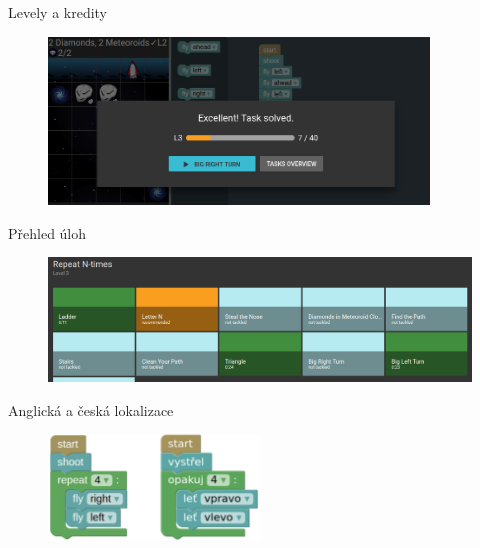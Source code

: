 \documentclass[
]{beamer}
\begin{document}
\begin{frame}{Levely a kredity}
\begin{figure}
\includegraphics[width=0.9\textwidth,height=.65\textheight,keepaspectratio]{../img/robomission-levels-credits}
\end{figure}
\end{frame}

\begin{frame}{Přehled úloh}
\begin{figure}
\includegraphics[width=\textwidth,height=.75\textheight,keepaspectratio]{../img/robomission-tasks-overview}
\end{figure}
\end{frame}

\begin{frame}{Anglická a česká lokalizace}
\begin{figure}
\includegraphics[width=0.5\textwidth,height=.75\textheight,keepaspectratio]{../img/roboblocks-english-czech}
\end{figure}
\end{frame}
\end{document}

